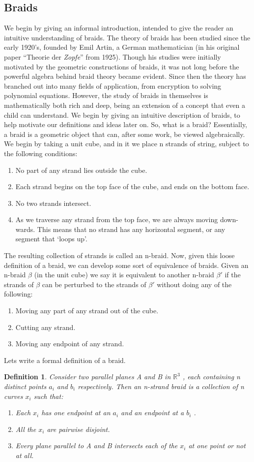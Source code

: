 \documentclass[preprint, 5p, 10pt]{elsarticle}
\theoremstyle{plain}
\newtheorem{definition}[theorem]{Definition}
\begin{document}
\subsection{Braids}
We begin by giving an informal introduction, intended to give the reader an
intuitive understanding of braids.
The theory of braids has been studied since the early 1920’s, founded by Emil
Artin, a German mathematician (in his original paper “Theorie der
\textit{Zopfe}” from 1925). Though his studies were initially motivated by the geometric
constructions of braids, it was not long before the powerful algebra behind braid
theory became evident. Since then the theory has branched out into many fields
of application, from encryption to solving polynomial equations. However, the
study of braids in themselves is mathematically both rich and deep, being an
extension of a concept that even a child can understand. We begin by giving an
intuitive description of braids, to help motivate our definitions and ideas later
on. So, what is a braid? Essentially, a braid is a geometric object that can, after
some work, be viewed algebraically. We begin by taking a unit cube, and in it
we place n strands of string, subject to the following conditions:
\begin{enumerate}
\item No part of any strand lies outside the cube.
\item Each strand begins on the top face of the cube, and ends on the bottom
face.
\item No two strands intersect.
\item As we traverse any strand from the top face, we are always moving down-
wards. This means that no strand has any horizontal segment, or any
segment that ‘loops up’.
\end{enumerate}
The resulting collection of strands is called an n-braid. Now,
given this loose definition of a braid, we can develop some sort of equivalence of
braids. Given an n-braid $\beta$ (in the unit cube) we say it is equivalent to another
n-braid $\beta '$ if the strands of $\beta$ can be perturbed to the strands of $\beta ′$ without doing
any of the following:
\begin{enumerate}
\item Moving any part of any strand out of the cube.
\item Cutting any strand.
\item Moving any endpoint of any strand.
\end{enumerate}
Lets write a formal definition of a braid. 
\begin{definition} Consider two parallel planes A and B in $\mathbb{R}^{3}$ , each containing
n distinct points ${a_i }$ and ${b_i }$ respectively. Then an n-strand braid is a
collection of n curves ${x_i }$ such that:
\begin{enumerate}
\item Each $x_i$ has one endpoint at an $a_i$ and an endpoint at a $b_i$ .
\item All the $x_i$ are pairwise disjoint.
\item Every plane parallel to A and B intersects each of the $x_i$ at one point
or not at all.
\end{enumerate}
\end{definition}
\end{document}
